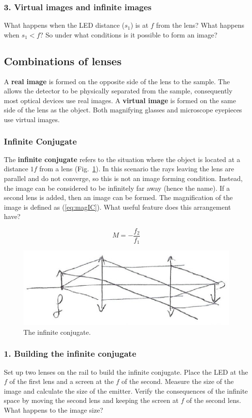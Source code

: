 \documentclass[a4paper]{report}
\begin{document}
\subsubsection{3. Virtual images and infinite images}
What happens when the LED distance ($s_1$) is at $f$ from the lens?
What happens when $s_1<f$? So under what conditions is it possible to
form an image?

\subsection{Combinations of lenses}
A \textbf{real image} is formed on the opposite side of the lens to
the sample. The allows the detector to be physically separated from
the sample, consequently most optical devices use real images. A
\textbf{virtual image} is formed on the same side of the lens as the
object. Both magnifying glasses and microscope eyepieces use virtual
images. 

\subsubsection{Infinite Conjugate}
The \textbf{infinite conjugate} refers to the situation where the
object is located at a distance $1f$ from a lens
(Fig.~\ref{infiniteConjugate}). In this scenario the rays leaving the
lens are parallel and do not converge, so this is not an image forming
condition. Instead, the image can be considered to be infinitely far
away (hence the name). If a second lens is added, then an image can
be formed. The magnification of the image is defined as
(\ref{eq:magIC}). What useful feature does this arrangement have? 

\begin{equation}
M=-\frac{f_2}{f_1}
\label{eq:magIC}
\end{equation}

\begin{figure}[h]
\center
\includegraphics[width=4.5in]{infiniteConjugate.eps}
\caption{The infinite conjugate.}
\label{infiniteConjugate}
\end{figure}
\subsubsection{1. Building the infinite conjugate}
Set up two lenses on the rail to build the infinite conjugate. Place
the LED at the $f$ of the first lens and a screen at the $f$ of the
second. Measure the size of the image and calculate the size of the
emitter. Verify the consequences of the infinite space by moving the
second lens and keeping the screen at $f$ of the second lens. What
happens to the image size?
\end{document}
